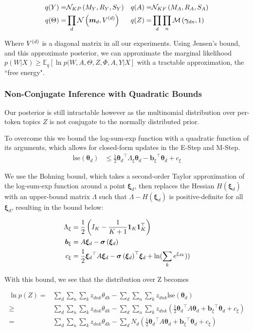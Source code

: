 \documentclass[10pt,fleqn]{article}
\newcommand \ex[2] {
    \mathbb{E}_{ { #2 } }\left[ #1 \right]
}
\newcommand \halve[1] {
	\frac{#1}{2}
}
\newcommand \half {
    \halve{1}
}
\newcommand \T { ^\top }
\newcommand \vv[1] { \bm #1 }
\newcommand \Ed {{ \vv{\xi}_d}}
\newcommand \Edk {{\xi_{dk}}}
\newcommand \Axi { { \Lambda_{\xi} } }
\newcommand \bxi { { \vv{b}_{\xi} } }
\newcommand \cxi { { c_{\xi} } }
\newcommand \zdnk[0] { { z_{dnk} } }
\newcommand \thd[0]  { { \vv \theta_d } }
\newcommand \thdk[0] { { \theta_{dk} } }
\newcommand \nor[2]   { \mathcal{N} \left( {#1}, {#2} \right) }
\newcommand \muln[2]  { \mathcal{M} \left( {#1},{#2} \right) }
\newcommand \md   { \vv{m}_d }
\newcommand \lse { \text{lse} }
\begin{document}
\begin{align}
q(Y) = & \mnord{KP}{M_Y}{R_Y}{S_Y} & q(A) = & \mnord{KF}{M_A}{R_A}{S_A} \\ 
q(\Theta) = & \prod_d \nor{\md}{\Vd} & q(Z) = & \prod_d \prod_n \muln{\vv{\gamma}_{dn}}{1} 
\end{align}


Where $V^{(d)}$ is a diagonal matrix in all our experiments. Using Jensen's bound, and this approximate posterior, we can approximate the marginal likelihood $p(W | X) \geq \ex{\ln p(W,A,\Theta,Z,\Phi,A,Y| X}{q}$ with a tractable approximation, the ``free energy".

\subsubsection{Non-Conjugate Inference with Quadratic Bounds}
Our posterior is still intractable however as the multinomial distribution over per-token topics $Z$ is not conjugate to the normally distributed prior.

To overcome this we bound the log-sum-exp function with a quadratic function of its arguments, which allows for closed-form updates in the E-Step and M-Step. 
\begin{align}
\lse(\thd) & \leq \half \thd\T \Axi \thd - \bxi\T\thd + \cxi
\end{align}

We use the Bohning bound\cite{Bohning1988}, which takes a second-order Taylor approximation of the log-sum-exp function around a point $\Ed$, then replaces the Hessian $H(\Ed)$ with an upper-bound matrix $\Lambda$ such that $\Lambda - H(\Ed)$ is positive-definite for all $\Ed$, resulting in the bound below:

\begin{align}
\Axi & = \half \left(I_K - \frac{1}{K+1}\mathbf{1}_K\mathbf{1}_K\T   \right) \\
\bxi & = A \Ed  - \sigmoid{\Ed} \\
\cxi & = \half \Ed\T A \Ed - \sigmoid{\Ed}\T\Ed + \ln(\sum_k e^{\Edk}))
\end{align} 


With this bound, we see that the distribution over Z becomes

\begin{align}
\ln p(Z) = & \sum_d \sum_n \sum_k \zdnk \thdk - \sum_d \sum_n \sum_k \zdnk \lse(\thd) \\
\geq & \sum_d \sum_n \sum_k \zdnk \thdk - \sum_d \sum_n \sum_k \zdnk \left( \half \thd\T A \thd + \bxi\T\thd + \cxi \right)\\
= & \sum_d \sum_n \sum_k \zdnk \thdk - \sum_d N_d \left( \half \thd\T A \thd + \bxi\T\thd + \cxi \right)
\end{align}
\end{document}
